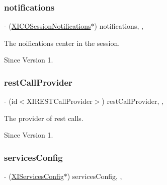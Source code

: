 \subsubsection{\texorpdfstring{notifications}{notifications}}
{\footnotesize\ttfamily -\/ (\hyperlink{interface_x_i_c_o_session_notifications}{X\+I\+C\+O\+Session\+Notifications}$\ast$) notifications\hspace{0.3cm}{\ttfamily [read]}, {\ttfamily [nonatomic]}, {\ttfamily [assign]}}



The noifications center in the session. 

\begin{DoxySince}{Since}
Version 1. 
\end{DoxySince}
\hypertarget{interface_x_i_session_internal_a7df5c2d8d7c730b7e6230e195ef23327}{}\label{interface_x_i_session_internal_a7df5c2d8d7c730b7e6230e195ef23327} 
\subsubsection{\texorpdfstring{rest\+Call\+Provider}{restCallProvider}}
{\footnotesize\ttfamily -\/ (id$<$X\+I\+R\+E\+S\+T\+Call\+Provider$>$) rest\+Call\+Provider\hspace{0.3cm}{\ttfamily [read]}, {\ttfamily [nonatomic]}, {\ttfamily [assign]}}



The provider of rest calls. 

\begin{DoxySince}{Since}
Version 1. 
\end{DoxySince}
\hypertarget{interface_x_i_session_internal_ad51887fa9c72b74e05a63e71619d9cb0}{}\label{interface_x_i_session_internal_ad51887fa9c72b74e05a63e71619d9cb0} 
\subsubsection{\texorpdfstring{services\+Config}{servicesConfig}}
{\footnotesize\ttfamily -\/ (\hyperlink{interface_x_i_services_config}{X\+I\+Services\+Config}$\ast$) services\+Config\hspace{0.3cm}{\ttfamily [read]}, {\ttfamily [nonatomic]}, {\ttfamily [assign]}}



